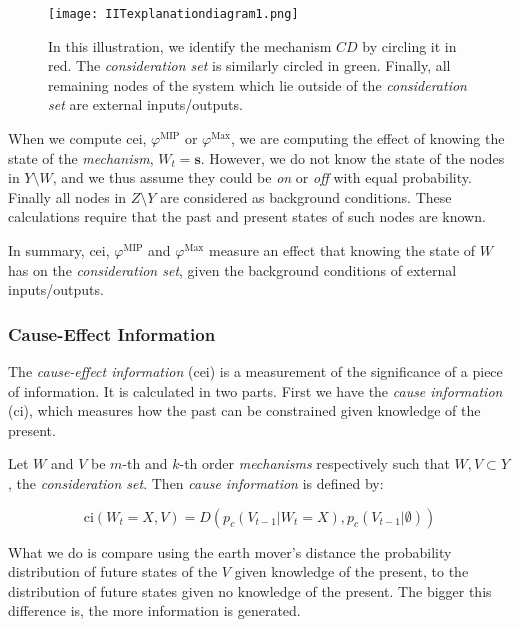 \begin{SCfigure}
	\centering
	\texttt{[image: IITexplanationdiagram1.png]}
	\caption{In this illustration, we identify the mechanism $CD$ by circling it in red. The \textit{consideration set} is similarly circled in green. Finally, all remaining nodes of the system which lie outside of the \textit{consideration set} are external inputs/outputs.}
	\label{fig:IIT_illustration1}
\end{SCfigure}





When we compute cei, $\varphi^{\text{MIP}}$ or $\varphi^{\text{Max}}$, we are computing the effect of knowing the state of the \textit{mechanism}, $W_t = \mathbf{s}$. However, we do not know the state of the nodes in $Y\setminus W$, and we thus assume they could be \textit{on} or \textit{off} with equal probability. Finally all nodes in $Z \setminus Y$ are considered as background conditions. These calculations require that the past and present states of such nodes are known. 

In summary, cei, $\varphi^{\text{MIP}}$ and $\varphi^{\text{Max}}$ measure an effect that knowing the state of $W$ has on the \textit{consideration set}, given the background conditions of external inputs/outputs.

\subsubsection{Cause-Effect Information}
\label{sec:cei}
The \textit{cause-effect information} (cei) is a measurement of the significance of a piece of information. It is calculated in two parts. First we have the \textit{cause information} (ci), which measures how the past can be constrained given knowledge of the present. 

Let $W$ and $V$ be $m$-th and $k$-th order \textit{mechanisms} respectively such that $W,V \subset Y$, the \textit{consideration set}. Then \textit{cause information} is defined \cite{oizumi2014phenomenology} by:

\begin{equation}
\label{def:ci}
\text{ci}(W_{t} = X, V) = D\left(p_c(V_{t-1}|W_{t} = X),p_c(V_{t-1}|\emptyset)\right)
\end{equation}

What we do is compare using the earth mover's distance the probability distribution of future states of the  $V $ given knowledge of the present, to the distribution of future states given no knowledge of the present. The bigger this difference is, the more information is generated. 

